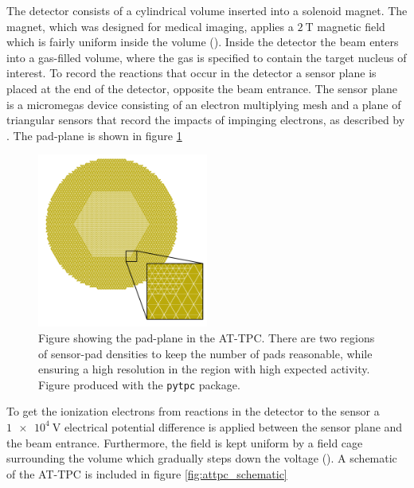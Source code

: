  The detector consists of a cylindrical volume inserted into a solenoid magnet. The magnet, which was designed for medical imaging, applies a $\SI{2}{\tesla}$ magnetic field which is fairly uniform inside the volume (\cite{Bradt2017a}). Inside the detector the beam enters into a gas-filled volume, where the gas is specified to contain the target nucleus of interest. To record the reactions that occur in the detector a sensor plane is placed at the end of the detector, opposite the beam entrance. The sensor plane is a micromegas device consisting of an electron multiplying mesh and a plane of triangular sensors that record the impacts of impinging electrons, as described by \citet{Giomataris1996}. The pad-plane is shown in figure \ref{fig:attpc_padplane}

 \begin{figure}
\centering
\includegraphics[width=0.5\textwidth]{../plots/at_tpc_padplane}
\caption{Figure showing the pad-plane in the AT-TPC. There are two regions of sensor-pad densities to keep the number of pads reasonable, while ensuring a high resolution in the region with high expected activity. Figure produced with the \lstinline{pytpc} package.}\label{fig:attpc_padplane}
 \end{figure}

 To get the ionization electrons from reactions in the detector to the sensor a $\SI{1e4}{\volt}$ electrical potential difference is applied between the sensor plane and the beam entrance. Furthermore, the field is kept uniform by a field cage surrounding the volume which gradually steps down the voltage (\cite{Bradt2017a}). A schematic of the AT-TPC is included in figure \ref{fig:attpc_schematic}


